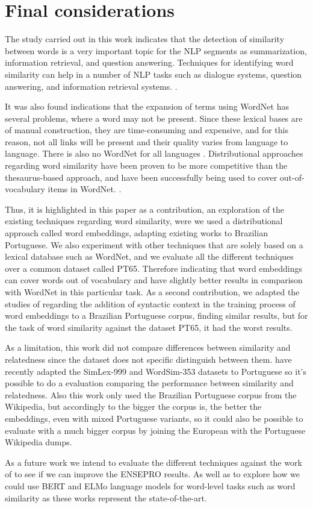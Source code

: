 \section{Final considerations}\label{chap:conclusions}

The study carried out in this work indicates that the detection of similarity between words is a very important topic for the NLP segments as summarization, information retrieval, and question answering. Techniques for identifying word similarity can help in a number of NLP tasks such as dialogue systems, question answering, and information retrieval systems. \cite{Islam2007ApplicationsOC,Pilehvar2013,Agirre2009}.

It was also found indications that the expansion of terms using WordNet has several problems, where a word may not be present. Since these lexical bases are of manual construction, they are time-consuming and expensive, and for this reason, not all links will be present and their quality varies from language to language.  There is also no WordNet for all languages \cite{Leeuwenberga2016}. Distributional approaches regarding word similarity have been proven to be more competitive than the thesaurus-based approach, and have been successfully being used to cover out-of-vocabulary items in WordNet.  \cite{gonccalo2018distributional, Agirre2009}.

Thus, it is highlighted in this paper as a contribution, an exploration of the existing techniques regarding word similarity, were we used a distributional approach called word embeddings, adapting existing works to Brazilian Portuguese. We also experiment with other techniques that are solely based on a lexical database such as WordNet, and we evaluate all the different techniques over a common dataset called PT65. Therefore indicating that word embeddings can cover words out of vocabulary and have slightly better results in comparison with WordNet in this particular task. As a second contribution, we adapted the studies of  regarding the addition of syntactic context in the training process of word embeddings to a Brazilian Portuguese corpus, finding similar results, but for the task of word similarity against the dataset PT65, it had the worst results.

As a limitation, this work did not compare differences between similarity and relatedness since the dataset does not specific distinguish between them.  have recently adapted the SimLex-999 and WordSim-353 datasets to Portuguese so it's possible to do a evaluation comparing the performance between similarity and relatedness. Also this work only used the Brazilian Portuguese corpus from the Wikipedia, but accordingly to  the bigger the corpus is, the better the embeddings, even with mixed Portuguese variants, so it could also be possible to evaluate with a much bigger corpus by joining the European with the Portuguese Wikipedia dumps.

As a future work we intend to evaluate the different techniques against the work of  to see if we can improve the ENSEPRO results. As well as to explore how we could use BERT and ELMo language models for word-level tasks such as word similarity as these works represent the state-of-the-art.